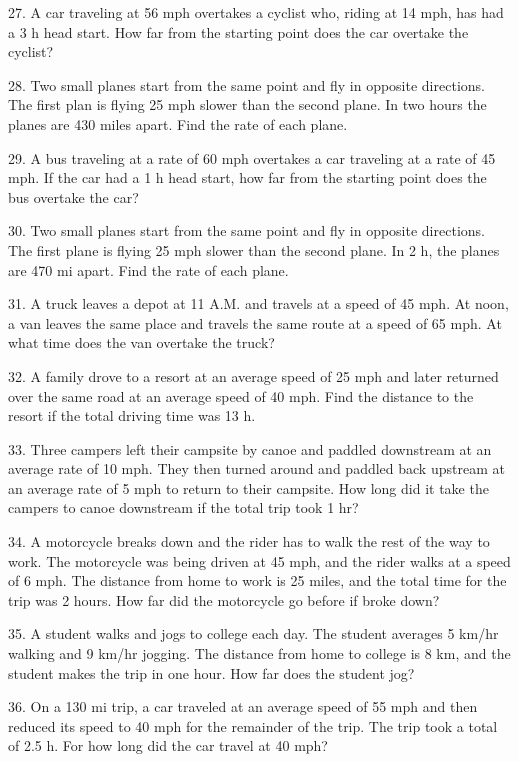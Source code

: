 27. A car traveling at 56 mph overtakes a cyclist who, riding at 14 mph, has
had a 3 h head start. How far from the starting point does the
car overtake the cyclist?

28. Two small planes start from the same point and fly in opposite directions.
The first plan is flying 25 mph slower than the second
plane. In two hours the planes are 430 miles apart. Find
the rate of each plane.

29. A bus traveling at a rate of 60 mph overtakes a car traveling at a rate of
45 mph. If the car had a 1 h head start, how far from the
starting point does the bus overtake the car?

30. Two small planes start from the same point and fly in opposite directions.
The first plane is flying 25 mph slower than the second
plane. In 2 h, the planes are 470 mi apart. Find the
rate of each plane.

31. A truck leaves a depot at 11 A.M. and travels at a speed of 45 mph. At
noon, a van leaves the same place and travels the same route at a
speed of 65 mph. At what time does the van overtake the truck?

32. A family drove to a resort at an average speed of 25 mph and later
returned over the same road at an average speed of 40 mph.
Find the distance to the resort if the total driving time was
13 h.

33. Three campers left their campsite by canoe and paddled downstream at an average rate of 10 mph. They then turned around and paddled
back upstream at an average rate of 5 mph
to return to their campsite. How long did it take the campers
to canoe downstream if the total trip took 1 hr?

\pagebreak

34. A motorcycle breaks down and the rider has to walk the rest of the way to
work. The motorcycle was being driven at 45 mph, and the
rider walks at a speed of 6 mph. The distance from home to
work is 25 miles, and the total time for the trip was 2
hours. How far did the motorcycle go before if broke down?

35. A student walks and jogs to college each day. The student averages 5 km/hr
walking and 9 km/hr jogging. The distance from home to college
is 8 km, and the student makes the trip in one hour. How
far does the student jog?

36. On a 130 mi trip, a car traveled at an average speed of 55 mph and then reduced its speed to 40 mph for the remainder of the
trip. The trip took a total of 2.5 h. For how long did the
car travel at 40 mph?

